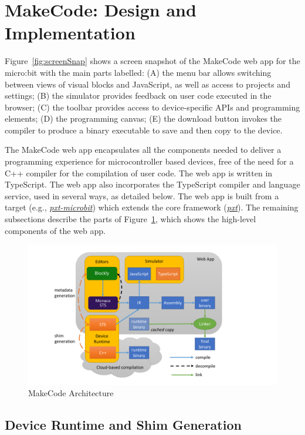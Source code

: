 \section{MakeCode: Design and Implementation}
\label{sec:makecode}

Figure~\ref{fig:screenSnap} shows a screen snapshot of the MakeCode web app for the micro:bit
with the main parts labelled: 
(A) the menu bar allows switching between views of visual blocks
and JavaScript, as well as access to projects and settings; 
(B) the simulator provides feedback on user code executed in the browser;
(C) the toolbar provides access to device-specific APIs and programming elements;
(D) the programming canvas; 
(E) the download button invokes the compiler to
produce a binary executable to save and then copy to the device.

The MakeCode web app encapsulates all the components needed to deliver a programming experience 
for microcontroller based devices, free of the need for a C++ compiler for the compilation of user 
code.
The web app is written in TypeScript. The web app also incorporates the TypeScript compiler and 
language service, used in several ways, as detailed below. 
The web app is built from a target (e.g., \emph{\href{https://github.com/microsoft/pxt-microbit}{pxt-microbit}})
which extends the core framework (\emph{\href{https://github.com/microsoft/pxt}{pxt}}).
The remaining subsections describe the parts of Figure~\ref{fig:makecode}, 
which shows the high-level components of the web app.

\begin{figure}[t]
    \includegraphics[width=5.5in]{makecodeFig.pdf}
\caption{\label{fig:makecode}MakeCode Architecture}
\end{figure}

\subsection{Device Runtime and Shim Generation}

